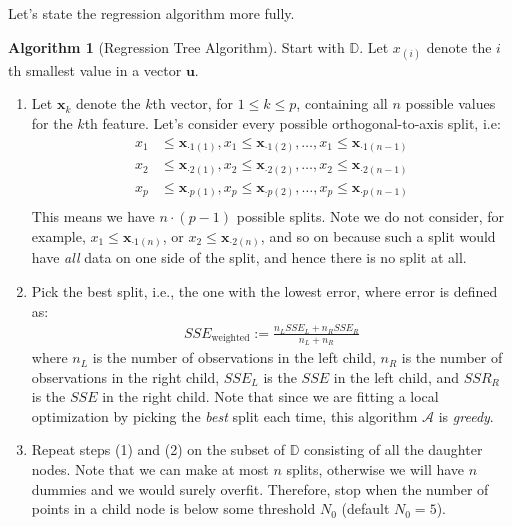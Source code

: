 \documentclass[12pt, a4paper]{article}
\theoremstyle{definition}
\newtheorem{algorithm}{Algorithm}
\begin{document}
	Let's state the regression algorithm more fully.
	\begin{tcolorbox}[breakable]
		\begin{algorithm}[Regression Tree Algorithm]
			
			\label{alg:regression-tree-alg}
			Start with $\mathbb{D}$. Let $x_{(i)}$ denote the $i$th smallest
			value in a vector $\bm{u}$.
			\begin{enumerate}[label=(\arabic*)]
				\item Let $\bm{x}_k$ denote the $k$th vector, for $1\leq k\leq p$,
				containing all $n$ possible values for the $k$th feature.
				Let's consider every possible orthogonal-to-axis split, i.e:
				\begin{align*}
					x_1&\leq \bm{x}_{\cdot 1(1)}, x_1 \leq \bm{x}_{\cdot 1(2)}, \ldots, x_1 \leq \bm{x}_{\cdot 1(n-1)}\\
					x_2&\leq \bm{x}_{\cdot 2(1)}, x_2 \leq \bm{x}_{\cdot 2(2)}, \ldots, x_2 \leq \bm{x}_{\cdot 2(n-1)}\\
					x_p&\leq \bm{x}_{\cdot p(1)}, x_p \leq \bm{x}_{\cdot p(2)}, \ldots, x_p \leq \bm{x}_{\cdot p(n-1)}\\
				\end{align*}
				This means we have $n\cdot (p-1)$ possible splits. Note we do not
				consider, for example, $x_1\leq \bm{x}_{\cdot 1(n)}$,
				or $x_2\leq \bm{x}_{\cdot 2(n)}$, and so on because such a split
				would have \textit{all} data on one side of the split, and hence
				there is no split at all.
				\item Pick the best split, i.e., the one with the lowest error,
				where error is defined as:
				\begin{align*}
					SSE_{\text{weighted}} := \frac{n_L SSE_L + n_R SSE_R}{n_L + n_R}
				\end{align*}
				where $n_L$ is the number of observations in the left child,
				$n_R$ is the number of observations in the right child, $SSE_L$
				is the $SSE$ in the left child, and $SSR_R$ is the $SSE$ in
				the right child. Note that since we are fitting a local
				optimization by picking the \textit{best} split each time, this
				algorithm $\mathcal{A}$ is \textit{greedy}.
				\item Repeat steps (1) and (2) on the subset of $\mathbb{D}$
				consisting of all the daughter nodes. Note that we can make
				at most $n$ splits, otherwise we will have $n$ dummies and we
				would surely overfit. Therefore, stop when the number of points
				in a child node is below some threshold $N_0$ (default $N_0 = 5$).
			\end{enumerate}
		\end{algorithm}
	\end{tcolorbox}
\end{document}
